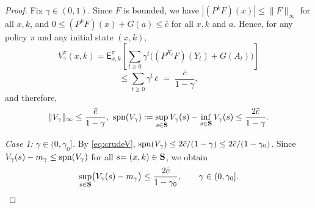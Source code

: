 \documentclass[letterpaper,10pt,conference]{ieeeconf}  %
\def\EE{\mathsf{E}}
\newcommand{\spn}{{\rm spn}}
\begin{document}
\medskip
\begin{proof}
Fix $\gamma\in(0,1)$. Since $F$ is bounded, we have
$|(P^kF)(x)|\le \|F\|_\infty$ for all $x,k$, and  
${0\le}(P^kF)(x)+G(a){\le \bar c}$ {for all $x,k$ and $a$}.
Hence, for any policy $\pi$ and any initial state $(x,k)$,
\[
{V_\gamma^\pi(x,k)=} \EE^\pi_{x,k}\!\left[\sum_{t\ge 0}\gamma^t\bigl((P^{K_t}F)({Y}_t)+G({A}_t)\bigr)\right]
\]
\[
\le \sum_{t\ge 0}\gamma^t\,\bar c \;=\; \frac{\bar c}{1-\gamma},
\]
and therefore,
\begin{equation}
\label{eq:crudeV}
\|V_\gamma\|_\infty \le \frac{\bar c}{1-\gamma},
\
\spn(V_\gamma):=\sup_{s{\in {\bf S}}} V_\gamma(s)-\inf_{s{\in {\bf S}}} V_\gamma(s)\le \frac{2\bar c}{1-\gamma}.
\end{equation}

\smallskip
\noindent\emph{Case 1: $\gamma\in(0,\gamma_0]$.}
By \eqref{eq:crudeV}, $\spn(V_\gamma)\le 2\bar c/(1-\gamma)\le 2\bar c/(1-\gamma_0)$.
Since $V_\gamma(s)-m_\gamma\le \spn(V_\gamma)$ for all $s{=(x,k)\in {\bf S}}$, we obtain
\[
\sup_{s{\in {\bf S}}}\bigl(V_\gamma(s)-m_\gamma\bigr)\le \frac{2\bar c}{1-\gamma_0},
\qquad \gamma\in(0,\gamma_0].
\]


\end{proof}
\end{document}
